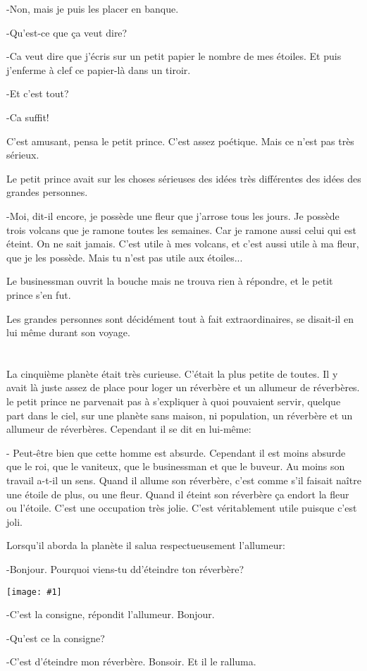 \documentclass{report}
\newcommand{\parachapter}[2][]{\end{paracol}\chapter[#1]{#2}\begin{paracol}{2}}
\newcommand{\incpic}[1]{%
\end{paracol}
\begin{center}
    \texttt{[image: \#1]}
\end{center}
\begin{paracol}{2}}
\begin{document}
\begin{paracol}{2}
-Non, mais je puis les placer en banque.

-Qu'est-ce que ça veut dire?

-Ca veut dire que j'écris sur un petit papier le nombre de mes étoiles. Et puis j'enferme à clef ce papier-là dans un tiroir.

-Et c'est tout?

-Ca suffit!

C'est amusant, pensa le petit prince. C'est assez poétique. Mais ce n'est pas très sérieux.

Le petit prince avait sur les choses sérieuses des idées très différentes des idées des grandes personnes.

-Moi, dit-il encore, je possède une fleur que j'arrose tous les jours. Je possède trois volcans que je ramone toutes les semaines. Car je ramone aussi celui qui est éteint. On ne sait jamais. C'est utile à mes volcans, et c'est aussi utile à ma fleur, que je les possède. Mais tu n'est pas utile aux étoiles...

Le businessman ouvrit la bouche mais ne trouva rien à répondre, et le petit prince s'en fut.

Les grandes personnes sont décidément tout à fait extraordinaires, se disait-il en lui même durant son voyage.

\parachapter{} %
La cinquième planète était très curieuse. C'était la plus petite de toutes. Il y avait là juste assez de place pour loger un réverbère et un allumeur de réverbères. le petit prince ne parvenait pas à s'expliquer à quoi pouvaient servir, quelque part dans le ciel, sur une planète sans maison, ni population, un réverbère et un allumeur de réverbères. Cependant il se dit en lui-même:

- Peut-être bien que cette homme est absurde. Cependant il est moins absurde que le roi, que le vaniteux, que le businessman et que le buveur. Au moins son travail a-t-il un sens. Quand il allume son réverbère, c'est comme s'il faisait naître une étoile de plus, ou une fleur. Quand il éteint son réverbère ça endort la fleur ou l'étoile. C'est une occupation très jolie. C'est véritablement utile puisque c'est joli.

Lorsqu'il aborda la planète il salua respectueusement l'allumeur:

-Bonjour. Pourquoi viens-tu dd'éteindre ton réverbère?
\incpic{pic/image29.jpeg}
-C'est la consigne, répondit l'allumeur. Bonjour.

-Qu'est ce la consigne?

-C'est d'éteindre mon réverbère. Bonsoir.
Et il le ralluma.


\end{paracol}
\end{document}
